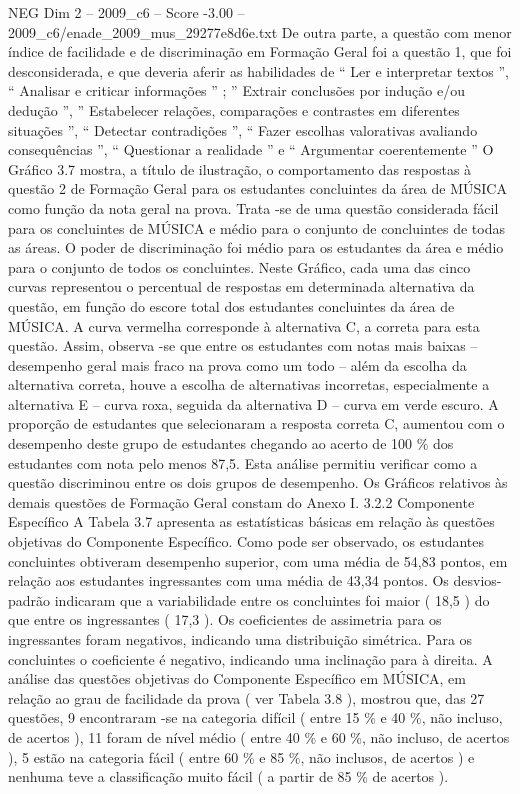 \begin{textsample}{NEG Dim 2 – 2009\_c6 – Score -3.00 – 2009\_c6/enade\_2009\_mus\_29277e8d6e.txt}
De outra parte, a questão com menor índice de facilidade e de discriminação em Formação Geral foi a questão 1, que foi desconsiderada, e que deveria aferir as habilidades de “ Ler e interpretar textos ”, “ Analisar e criticar informações ” ; ” Extrair conclusões por indução e/ou dedução ”, ” Estabelecer relações, comparações e contrastes em diferentes situações ”, “ Detectar contradições ”, “ Fazer escolhas valorativas avaliando consequências ”, “ Questionar a realidade ” e “ Argumentar coerentemente ” O Gráfico 3.7 mostra, a título de ilustração, o comportamento das respostas à questão 2 de Formação Geral para os estudantes concluintes da área de MÚSICA como função da nota geral na prova.
Trata -se de uma questão considerada fácil para os concluintes de MÚSICA e médio para o conjunto de concluintes de todas as áreas.
O poder de discriminação foi médio para os estudantes da área e médio para o conjunto de todos os concluintes.
Neste Gráfico, cada uma das cinco curvas representou o percentual de respostas em determinada alternativa da questão, em função do escore total dos estudantes concluintes da área de MÚSICA.
A curva vermelha corresponde à alternativa C, a correta para esta questão.
Assim, observa -se que entre os estudantes com notas mais baixas – desempenho geral mais fraco na prova como um todo – além da escolha da alternativa correta, houve a escolha de alternativas incorretas, especialmente a alternativa E – curva roxa, seguida da alternativa D – curva em verde escuro.
A proporção de estudantes que selecionaram a resposta correta C, aumentou com o desempenho deste grupo de estudantes chegando ao acerto de 100 \% dos estudantes com nota pelo menos 87,5.
Esta análise permitiu verificar como a questão discriminou entre os dois grupos de desempenho.
Os Gráficos relativos às demais questões de Formação Geral constam do Anexo I. 3.2.2 Componente Específico A Tabela 3.7 apresenta as estatísticas básicas em relação às questões objetivas do Componente Específico.
Como pode ser observado, os estudantes concluintes obtiveram desempenho superior, com uma média de 54,83 pontos, em relação aos estudantes ingressantes com uma média de 43,34 pontos.
Os desvios-padrão indicaram que a variabilidade entre os concluintes foi maior ( 18,5 ) do que entre os ingressantes ( 17,3 ).
Os coeficientes de assimetria para os ingressantes foram negativos, indicando uma distribuição simétrica.
Para os concluintes o coeficiente é negativo, indicando uma inclinação para à direita.
A análise das questões objetivas do Componente Específico em MÚSICA, em relação ao grau de facilidade da prova ( ver Tabela 3.8 ), mostrou que, das 27 questões, 9 encontraram -se na categoria difícil ( entre 15 \% e 40 \%, não incluso, de acertos ), 11 foram de nível médio ( entre 40 \% e 60 \%, não incluso, de acertos ), 5 estão na categoria fácil ( entre 60 \% e 85 \%, não inclusos, de acertos ) e nenhuma teve a classificação muito fácil ( a partir de 85 \% de acertos ).

\end{textsample}
